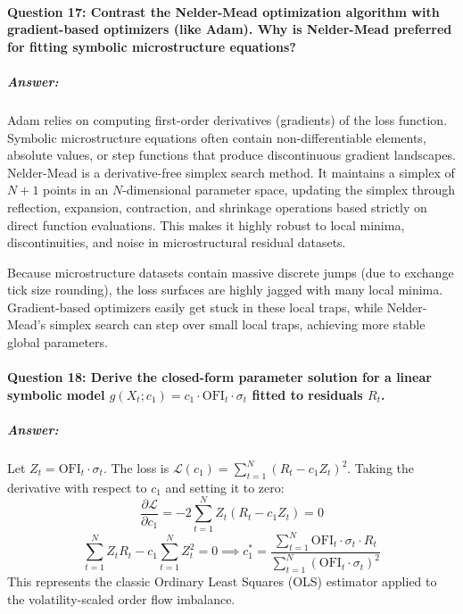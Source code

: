 \documentclass[11pt,a4paper]{article}
\begin{document}
\paragraph{Question 17: Contrast the Nelder-Mead optimization algorithm with gradient-based optimizers (like Adam). Why is Nelder-Mead preferred for fitting symbolic microstructure equations?}
\subparagraph{Answer:}
Adam relies on computing first-order derivatives (gradients) of the loss function. Symbolic microstructure equations often contain non-differentiable elements, absolute values, or step functions that produce discontinuous gradient landscapes.
Nelder-Mead is a derivative-free simplex search method. It maintains a simplex of $N+1$ points in an $N$-dimensional parameter space, updating the simplex through reflection, expansion, contraction, and shrinkage operations based strictly on direct function evaluations. This makes it highly robust to local minima, discontinuities, and noise in microstructural residual datasets.

Because microstructure datasets contain massive discrete jumps (due to exchange tick size rounding), the loss surfaces are highly jagged with many local minima. Gradient-based optimizers easily get stuck in these local traps, while Nelder-Mead's simplex search can step over small local traps, achieving more stable global parameters.

\paragraph{Question 18: Derive the closed-form parameter solution for a linear symbolic model $g(X_t; c_1) = c_1 \cdot \text{OFI}_t \cdot \sigma_t$ fitted to residuals $R_t$.}
\subparagraph{Answer:}
Let $Z_t = \text{OFI}_t \cdot \sigma_t$. The loss is $\mathcal{L}(c_1) = \sum_{t=1}^N \left( R_t - c_1 Z_t \right)^2$.
Taking the derivative with respect to $c_1$ and setting it to zero:
\begin{equation}
    \frac{\partial \mathcal{L}}{\partial c_1} = -2 \sum_{t=1}^N Z_t \left( R_t - c_1 Z_t \right) = 0
\end{equation}
\begin{equation}
    \sum_{t=1}^N Z_t R_t - c_1 \sum_{t=1}^N Z_t^2 = 0 \implies c_1^* = \frac{\sum_{t=1}^N \text{OFI}_t \cdot \sigma_t \cdot R_t}{\sum_{t=1}^N \left(\text{OFI}_t \cdot \sigma_t\right)^2}
\end{equation}
This represents the classic Ordinary Least Squares (OLS) estimator applied to the volatility-scaled order flow imbalance.
\end{document}
